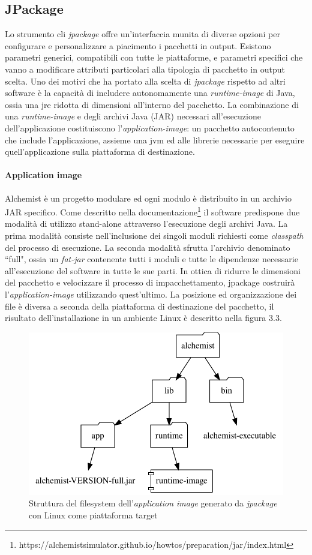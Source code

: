 \subsection{JPackage}\label{sec:design-jpackage} Lo strumento \ac{cli} \textit{jpackage} offre un'interfaccia munita di diverse opzioni per configurare e personalizzare a piacimento i pacchetti in output. Esistono parametri generici, compatibili con tutte le piattaforme, e parametri specifici che vanno a modificare attributi particolari alla tipologia di pacchetto in output scelta. Uno dei motivi che ha portato alla scelta di \textit{jpackage} rispetto ad altri software è la capacità di includere autonomamente una \textit{runtime-image} di Java, ossia una \ac{jre} ridotta di dimensioni all'interno del pacchetto. La combinazione di una \textit{runtime-image} e degli archivi Java (JAR) necessari all'esecuzione dell'applicazione costituiscono l'\textit{application-image}: un pacchetto autocontenuto che include l'applicazione, assieme una \ac{jvm} ed alle librerie necessarie per eseguire quell'applicazione sulla piattaforma di destinazione.

\paragraph{Application image} Alchemist è un progetto modulare ed ogni modulo è distribuito in un archivio JAR specifico. Come descritto nella documentazione\footnote{https://alchemistsimulator.github.io/howtos/preparation/jar/index.html} il software predispone due modalità di utilizzo stand-alone attraverso l'esecuzione degli archivi Java. La prima modalità consiste nell'inclusione dei singoli moduli richiesti come \textit{classpath} del processo di esecuzione. La seconda modalità sfrutta l'archivio denominato ``full", ossia un \textit{fat-jar} contenente tutti i moduli e tutte le dipendenze necessarie all'esecuzione del software in tutte le sue parti. In ottica di ridurre le dimensioni del pacchetto e velocizzare il processo di impacchettamento, jpackage costruirà l'\textit{application-image} utilizzando quest'ultimo. La posizione ed organizzazione dei file è diversa a seconda della piattaforma di destinazione del pacchetto, il risultato dell'installazione in un ambiente Linux è descritto nella figura 3.3.  

\begin{figure}
	\centering
	\includegraphics[width=.7\linewidth]{figures/application-image-folder-structure.pdf}
	\caption{Struttura del filesystem dell'\textit{application image} generato da \textit{jpackage} con Linux come piattaforma target}
	\label{fig:application-image-folder-structure}
\end{figure}

